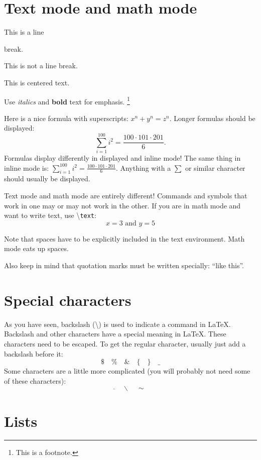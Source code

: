 \documentclass[12pt,letterpaper]{article}
\begin{document}
\section{Text mode and math mode}

This is a line

break.

This is not a line
break.

\begin{center}
This is centered text.
\end{center}

Use \textit{italics} and \textbf{bold} text for emphasis.
\footnote{This is a footnote.}

Here is a nice formula with superscripts: $x^n + y^n = z^n$.
Longer formulas should be displayed:
\[
\sum_{i = 1}^{100} i^2 = \frac{100 \cdot 101 \cdot 201}{6}.
\]
Formulas display differently in displayed and inline mode!
The same thing in inline mode is:
$\sum_{i = 1}^{100} i^2 = \frac{100 \cdot 101 \cdot 201}{6}$.
Anything with a $\sum$ or similar character should usually be
displayed.

Text mode and math mode are entirely different!
Commands and symbols that work in one may or may not work in the
other.
If you are in math mode and want to write text,
use \textbackslash{}\texttt{text}:
\[
x = 3 \text{ and } y = 5
\]

Note that spaces have to be explicitly included in the text environment.
Math mode eats up spaces.

Also keep in mind that quotation marks must be written specially:
``like this''.


\section{Special characters}

As you have seen,
backslash (\textbackslash{}) is used to indicate a command in \LaTeX.
Backslash and other characters have a special meaning in LaTeX.
These characters need to be escaped.
To get the regular character, usually just add a backslash
before it:
\[
\$ \quad \% \quad \& \quad \{ \quad \} \quad \_
\]
Some characters are a little more complicated
(you will probably not need some of these characters):
\[
\hat{ }  \quad \backslash{} \quad \sim
\]


\section{Lists}
\end{document}
